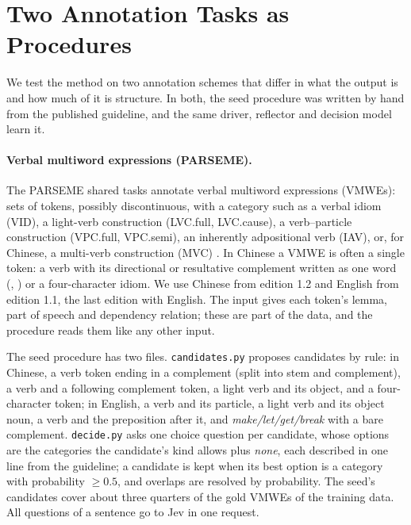 \section{Two Annotation Tasks as Procedures}
\label{sec:tasks}

We test the method on two annotation schemes that differ in what the output is and how much of it is structure. In both, the seed procedure was written by hand from the published guideline, and the same driver, reflector and decision model learn it.

\paragraph{Verbal multiword expressions (PARSEME).}
The PARSEME shared tasks annotate verbal multiword expressions (VMWEs): sets of tokens, possibly discontinuous, with a category such as a verbal idiom (VID), a light-verb construction (LVC.full, LVC.cause), a verb--particle construction (VPC.full, VPC.semi), an inherently adpositional verb (IAV), or, for Chinese, a multi-verb construction (MVC) \citep{ramisch2018parseme,ramisch2020parseme}. In Chinese a VMWE is often a single token: a verb with its directional or resultative complement written as one word (, ) or a four-character idiom. We use Chinese from edition 1.2 and English from edition 1.1, the last edition with English. The input gives each token's lemma, part of speech and dependency relation; these are part of the data, and the procedure reads them like any other input.

The seed procedure has two files. \texttt{candidates.py} proposes candidates by rule: in Chinese, a verb token ending in a complement (split into stem and complement), a verb and a following complement token, a light verb and its object, and a four-character token; in English, a verb and its particle, a light verb and its object noun, a verb and the preposition after it, and \emph{make/let/get/break} with a bare complement. \texttt{decide.py} asks one choice question per candidate, whose options are the categories the candidate's kind allows plus \emph{none}, each described in one line from the guideline; a candidate is kept when its best option is a category with probability $\geq 0.5$, and overlaps are resolved by probability. The seed's candidates cover about three quarters of the gold VMWEs of the training data. All questions of a sentence go to Jev in one request.

